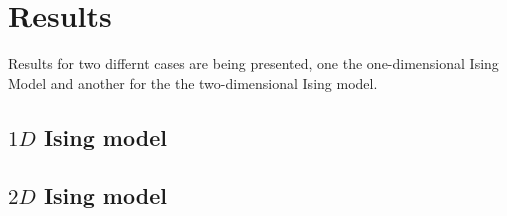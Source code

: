 \section{Results}
Results for two differnt cases are being presented, one the one-dimensional Ising Model and another for the the two-dimensional Ising model.

\subsection{\texorpdfstring{$1D$}{1D} Ising model}

\subsection{\texorpdfstring{$2D$}{2D} Ising model}